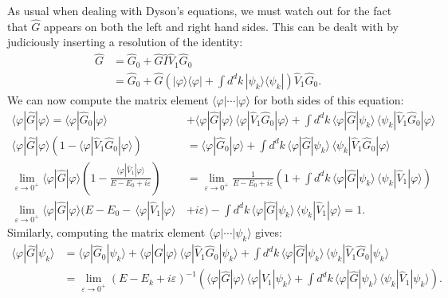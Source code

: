 \documentclass[pra,12pt]{revtex4}
\begin{document}
As usual when dealing with Dyson's equations, we must watch out for
the fact that $\hat{G}$ appears on both the left and right hand sides.
This can be dealt with by judiciously inserting a resolution of the
identity:
$$\begin{aligned}\hat{G} &= \hat{G}_0 + \hat{G} \hat{I} \hat{V}_1 \hat{G}_0 \\ &= \hat{G}_0 + \hat{G} \left(|\varphi\rangle\langle\varphi| + \int d^dk\, |\psi_k\rangle\langle\psi_k|\right) \hat{V}_1 \hat{G}_0. \end{aligned}$$
We can now compute the matrix element
$\langle\varphi|\cdots|\varphi\rangle$ for both sides of this equation:
$$\begin{aligned}\langle\varphi|\hat{G}|\varphi\rangle = \langle\varphi|\hat{G}_0|\varphi\rangle &+ \langle\varphi|\hat{G}|\varphi\rangle \, \langle\varphi|\hat{V}_1 \hat{G}_0|\varphi\rangle + \int d^dk\, \langle\varphi|\hat{G}|\psi_k\rangle \, \langle\psi_k| \hat{V}_1 \hat{G}_0|\varphi\rangle \\
\langle\varphi|\hat{G}|\varphi\rangle \left(1 - \langle\varphi|\hat{V}_1 \hat{G}_0|\varphi\rangle\right) &= \langle\varphi|\hat{G}_0|\varphi\rangle + \int d^dk\, \langle\varphi|\hat{G}|\psi_k\rangle \, \langle\psi_k| \hat{V}_1 \hat{G}_0|\varphi\rangle \\ \lim_{\varepsilon\rightarrow0^+}
\langle\varphi|\hat{G}|\varphi\rangle \left(1 - \frac{\langle\varphi|\hat{V}_1|\varphi\rangle}{E - E_0 + i\varepsilon}\right) &= \lim_{\varepsilon\rightarrow0^+} \frac{1}{E  - E_0 + i\varepsilon} \left(1+ \int d^dk\, \langle\varphi|\hat{G}|\psi_k\rangle \, \langle\psi_k| \hat{V}_1|\varphi\rangle \right) \\
\lim_{\varepsilon\rightarrow0^+} \langle\varphi|\hat{G}|\varphi\rangle \Big(E - E_0 -\, \langle\varphi|\hat{V}_1|\varphi\rangle \, & + i\varepsilon\Big) - \int d^dk\, \langle\varphi|\hat{G}|\psi_k\rangle \, \langle\psi_k| \hat{V}_1|\varphi\rangle = 1.\end{aligned}$$
Similarly, computing the matrix element
$\langle\varphi|\cdots|\psi_k\rangle$ gives:
$$\begin{aligned}
\langle\varphi|\hat{G}|\psi_k\rangle &= \langle\varphi|\hat{G}_0|\psi_k\rangle + \langle\varphi|\hat{G}|\varphi\rangle \, \langle\varphi|\hat{V}_1 \hat{G}_0|\psi_k\rangle + \int d^dk\, \langle\varphi|\hat{G}|\psi_k\rangle \, \langle\psi_k| \hat{V}_1 \hat{G}_0|\psi_k\rangle \\
&= \lim_{\varepsilon\rightarrow0^+} \left(E-E_k+i\varepsilon\right)^{-1} \left(\langle\varphi|\hat{G}|\varphi\rangle \, \langle\varphi|\hat{V}_1|\psi_k\rangle + \int d^dk\, \langle\varphi|\hat{G}|\psi_k\rangle \, \langle\psi_k| \hat{V}_1|\psi_k\rangle\right).\end{aligned}$$
\end{document}
